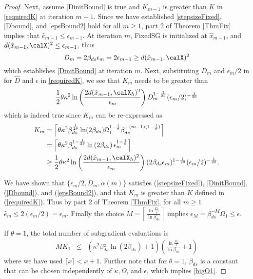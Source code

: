\begin{proof}
   Next, assume \eqref{DinitBound}  is true and $K_{m-1}$ is greater than $K$ in \eqref{requiredK} at iteration $m-1$. Since we have established \eqref{stepsizeFixed}, \eqref{Dbound}, and \eqref{epsBound2} hold for all $m\geq 1$, part 2 of Theorem \ref{ThmFix} implies that $\hat{e}_{m-1}\leq\epsilon_{m-1}$. At iteration $m$, FixedSG is initialized at $\hat{x}_{m-1}$, and $d(\hat{x}_{m-1},\calX)^2\leq\epsilon_{m-1}$, thus 
   $$
   D_m=2\beta_{ds}\epsilon_m = 2\epsilon_{m-1}\geq d(\hat{x}_{m-1},\calX)^2
   $$ 
   which establishes \eqref{DinitBound} at iteration $m$.
   Next, substituting $D_m$ and $\epsilon_m/2$ in for $\hat{D}$ and $\epsilon$ in \eqref{requiredK}, we see that $K_m$ needs to be greater than
    \begin{eqnarray*}
\frac{1}{2}\theta\kappa^2
    \ln\left(\frac{2d(\hat{x}_{m-1},\calX_h)^2}{\epsilon_m}\right)
    D_m^{1-\frac{1}{2\theta}}(\epsilon_m/2)^{-\frac{1}{2\theta}}\label{thisOne}
    \end{eqnarray*}
    which is indeed true since
$K_m$ can be re-expressed as
    \begin{align*}
    K_m&=\left\lceil 
    \theta\kappa^2\beta_{ds}^{\frac{1}{2\theta}}\ln(2\beta_{ds})\Omega_1^{1-\frac{1}{\theta}}\beta_{ds}^{-(m-1)(1-\frac{1}{\theta})}
    \right\rceil 
    \\    
    &=
    \left\lceil\theta\kappa^2
    \beta_{ds}^{1-\frac{1}{2\theta}}\ln\left(2\beta_{ds}\right)
    \epsilon_m^{1-\frac{1}{\theta}}\right\rceil
    \\
    &\geq 
    \frac{1}{2}\theta\kappa^2
    \ln\left(\frac{2d(\hat{x}_{m-1},\calX_h)^2}{\epsilon_m}\right)
    (2\beta_{ds}\epsilon_m)^{1-\frac{1}{2\theta}}(\epsilon_m/2)^{-\frac{1}{2\theta}}.
    \end{align*} 
    
    
    We have shown that $\{\epsilon_m/2,D_m,\alpha(m)\}$ satisfies (\ref{stepsizeFixed}), \eqref{DinitBound}, (\ref{Dbound}), and (\ref{epsBound2}), and that $K_m$ is greater than $K$ defined in (\ref{requiredK}).
 Thus by part 2 of Theorem \ref{ThmFix}, for all $m\geq 1$ $\hat{e}_m\leq 2(\epsilon_m/2)=\epsilon_{m}$. 
  Finally the choice $M = \left\lceil \frac{\ln\frac{\Omega_1}{\epsilon}}{\ln\beta_{ds}}\right\rceil$ implies $\epsilon_M=\beta_{ds}^{-M}\Omega_1\leq\epsilon$.
  
 If $\theta=1$, the total number of subgradient evaluations is
 \begin{eqnarray*}
 M K_1
&\leq& 
 \left(\kappa^2 \beta_{ds}^{\frac{1}{2}}\ln(2\beta_{ds})+1\right)
\left(\frac{\ln\frac{\Omega_1}{\epsilon}}{\ln\beta_{ds}}+1\right)
 \end{eqnarray*}
where we have used $\lceil x \rceil< x+1$. 
Further note that for $\theta=1$, $\beta_{ds}$ is a constant that can be chosen independently of $\kappa, \Omega$, and $\epsilon$,  which implies \eqref{bigO1}.


\end{proof}
